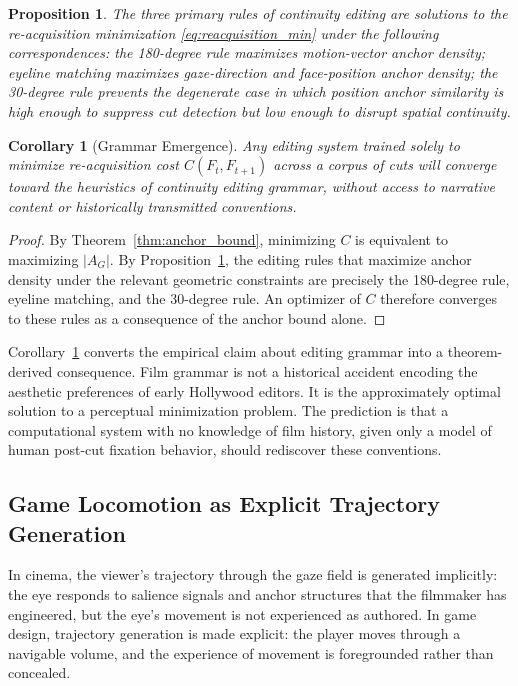 \documentclass[12pt, a4paper]{article}
\theoremstyle{plain}
\newtheorem{proposition}[theorem]{Proposition}
\newtheorem{corollary}[theorem]{Corollary}
\theoremstyle{definition}
\theoremstyle{remark}
\newcommand{\AG}{A_G}
\begin{document}
\begin{proposition}
\label{prop:grammar_as_optimization}
  The three primary rules of continuity editing are
  solutions to the re-acquisition minimization
  \eqref{eq:reacquisition_min} under the following
  correspondences: the 180-degree rule maximizes
  motion-vector anchor density; eyeline matching maximizes
  gaze-direction and face-position anchor density; the
  30-degree rule prevents the degenerate case in which
  position anchor similarity is high enough to suppress
  cut detection but low enough to disrupt spatial continuity.
\end{proposition}

\begin{corollary}[Grammar Emergence]
\label{cor:grammar_emergence}
  Any editing system trained solely to minimize
  re-acquisition cost $C(F_t, F_{t+1})$ across a corpus
  of cuts will converge toward the heuristics of
  continuity editing grammar, without access to narrative
  content or historically transmitted conventions.
\end{corollary}

\begin{proof}
  By Theorem~\ref{thm:anchor_bound}, minimizing $C$ is
  equivalent to maximizing $|\AG|$. By
  Proposition~\ref{prop:grammar_as_optimization}, the
  editing rules that maximize anchor density under the
  relevant geometric constraints are precisely the
  180-degree rule, eyeline matching, and the 30-degree
  rule. An optimizer of $C$ therefore converges to these
  rules as a consequence of the anchor bound alone.
\end{proof}

Corollary~\ref{cor:grammar_emergence} converts the
empirical claim about editing grammar into a theorem-derived
consequence. Film grammar is not a historical accident
encoding the aesthetic preferences of early Hollywood
editors. It is the approximately optimal solution to a
perceptual minimization problem. The prediction is that a
computational system with no knowledge of film history,
given only a model of human post-cut fixation behavior,
should rediscover these conventions.

\subsection{Game Locomotion as Explicit Trajectory Generation}
\label{subsec:gamelocomotion}

In cinema, the viewer's trajectory through the gaze field is
generated implicitly: the eye responds to salience signals
and anchor structures that the filmmaker has engineered, but
the eye's movement is not experienced as authored. In game
design, trajectory generation is made explicit: the player
moves through a navigable volume, and the experience of
movement is foregrounded rather than concealed.
\end{document}
